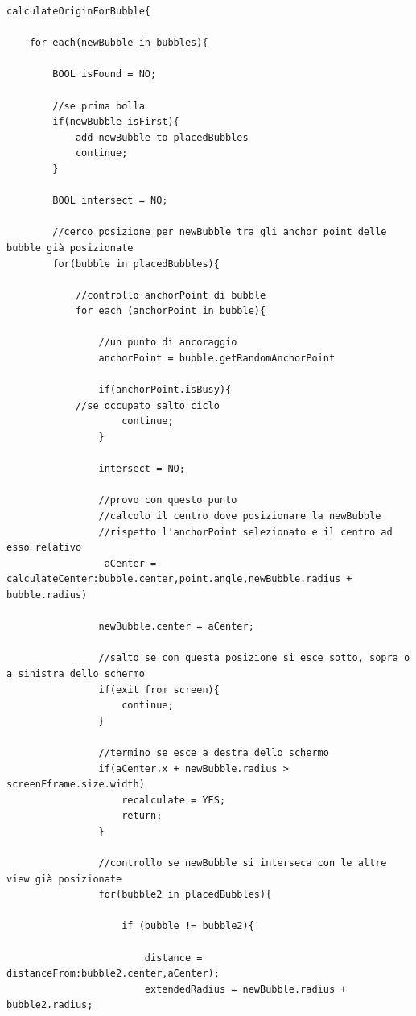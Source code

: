 \begin{lstlisting}[label=algo:3,caption=calculateOriginForBubble,breaklines=true,  commentstyle=\color{CadetBlue}]
calculateOriginForBubble{

    for each(newBubble in bubbles){

        BOOL isFound = NO;

        //se prima bolla
        if(newBubble isFirst){
            add newBubble to placedBubbles
            continue;
        }

        BOOL intersect = NO;

        //cerco posizione per newBubble tra gli anchor point delle bubble già posizionate
        for(bubble in placedBubbles){

            //controllo anchorPoint di bubble
            for each (anchorPoint in bubble){

                //un punto di ancoraggio
                anchorPoint = bubble.getRandomAnchorPoint

                if(anchorPoint.isBusy){
		    //se occupato salto ciclo
                    continue;
                }

                intersect = NO;

                //provo con questo punto
                //calcolo il centro dove posizionare la newBubble
                //rispetto l'anchorPoint selezionato e il centro ad esso relativo
                 aCenter = calculateCenter:bubble.center,point.angle,newBubble.radius + bubble.radius)

                newBubble.center = aCenter;

                //salto se con questa posizione si esce sotto, sopra o a sinistra dello schermo
                if(exit from screen){
                    continue;
                }

                //termino se esce a destra dello schermo
                if(aCenter.x + newBubble.radius > screenFframe.size.width)
                    recalculate = YES;
                    return;
                }

                //controllo se newBubble si interseca con le altre view già posizionate
                for(bubble2 in placedBubbles){

                    if (bubble != bubble2){
	    
                        distance = distanceFrom:bubble2.center,aCenter);
                        extendedRadius = newBubble.radius + bubble2.radius;


\end{lstlisting}
